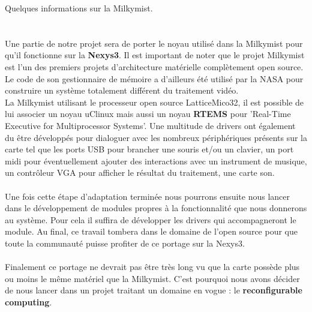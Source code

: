\vspace{15px}
{\Large Quelques informations sur la Milkymist.}\\
\\
\\
Une partie de notre projet sera de porter le noyau utilisé dans la Milkymist pour qu'il fonctionne sur la {\bf Nexys3}. Il est important de noter que le projet Milkymist est l'un des premiers projets d'architecture matérielle complètement open source. Le code de son gestionnaire de mémoire a d'ailleurs été utilisé par la NASA pour construire un système totalement différent du traitement vidéo.\\
La Milkymist utilisant le processeur open source LatticeMico32, il est possible de lui associer un noyau uClinux mais aussi un noyau {\bf RTEMS} pour 'Real-Time Executive for Multiprocessor Systems'. Une multitude de drivers ont également du être développés pour dialoguer avec les nombreux périphériques présents sur la carte tel que les ports USB pour brancher une souris et/ou un clavier, un port midi pour éventuellement ajouter des interactions avec un instrument de musique, un contrôleur VGA pour afficher le résultat du traitement, une carte son.\\
\\
Une fois cette étape d'adaptation terminée nous pourrons ensuite nous lancer dans le développement de modules propres à la fonctionnalité que nous donnerons au système. Pour cela il suffira de développer les drivers qui accompagneront le module. Au final, ce travail tombera dans le domaine de l'open source pour que toute la communauté puisse profiter de ce portage sur la Nexys3.\\
\\
Finalement ce portage ne devrait pas être très long vu que la carte possède plus ou moins le même matériel que la Milkymist. C'est pourquoi nous avons décider de nous lancer dans un projet traitant un domaine en vogue : le {\bf reconfigurable computing}.\\